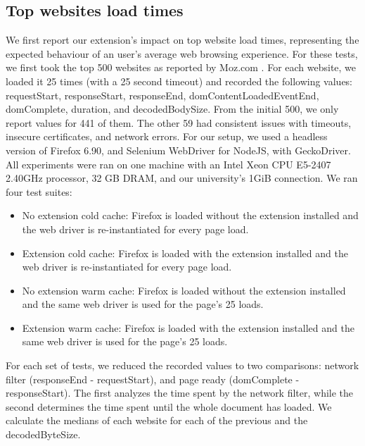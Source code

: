 \subsection{Top websites load times}
We first report our extension's impact on top website load times, representing the expected behaviour of an user's average web browsing experience. For these tests, we first took the top 500 websites as reported by Moz.com \cite{top500}. For each website, we loaded it 25 times (with a 25 second timeout) and recorded the following values: requestStart, responseStart, responseEnd, domContentLoadedEventEnd, domComplete, duration, and decodedBodySize. From the initial 500, we only report values for 441 of them. The other 59 had consistent issues with timeouts, insecure certificates, and network errors. For our setup, we used a headless version of Firefox 6.90, and Selenium WebDriver for NodeJS, with GeckoDriver. All experiments were ran on one machine with an Intel Xeon CPU E5-2407 2.40GHz processor, 32 GB DRAM, and our university's 1GiB connection. We ran four test suites:
\begin{itemize}
	\item No extension cold cache: Firefox is loaded without the extension installed and the web driver is re-instantiated for every page load.
	\item Extension cold cache: Firefox is loaded with the extension installed and the web driver is re-instantiated for every page load.
	\item No extension warm cache: Firefox is loaded without the extension installed and the same web driver is used for the page's 25 loads.
	\item Extension warm cache: Firefox is loaded with the extension installed and the same web driver is used for the page's 25 loads.
\end{itemize}

For each set of tests, we reduced the recorded values to two comparisons: network filter (responseEnd - requestStart), and page ready (domComplete - responseStart). The first analyzes the time spent by the network filter, while the second determines the time spent until the whole document has loaded. We calculate the medians of each website for each of the previous and the decodedByteSize.

